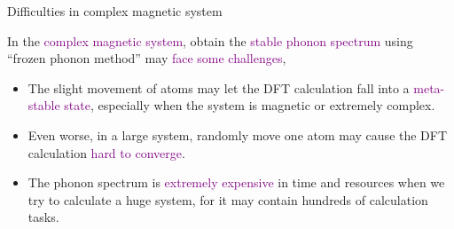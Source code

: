 \documentclass{beamer}
\begin{document}
\begin{frame}{Difficulties in complex magnetic system}
  \begin{block}{}
    In the \textcolor{purple}{complex magnetic system}, obtain the \textcolor{purple}{stable phonon spectrum} using ``frozen phonon method'' may \textcolor{purple}{face some challenges},
  \begin{itemize}
    \item The slight movement of atoms may let the DFT calculation fall into a \textcolor{purple}{meta-stable state}, especially when the system is magnetic or extremely complex.
    \item Even worse, in a large system, randomly move one atom may cause the DFT calculation \textcolor{purple}{hard to converge}.
    \item The phonon spectrum is \textcolor{purple}{extremely expensive} in time and resources when we try to calculate a huge system, for it may contain hundreds of calculation tasks.
  \end{itemize}
  \end{block}
\end{frame}
\end{document}
